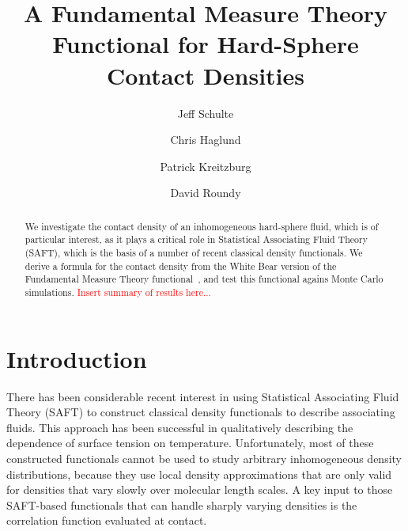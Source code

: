 \documentclass[letterpaper,twocolumn,amsmath,amssymb,jcp,10pt,aip]{revtex4-1}
\begin{document}
\title{A Fundamental Measure Theory Functional for Hard-Sphere Contact Densities}

\author{Jeff Schulte}
\author{Chris Haglund}
\author{Patrick Kreitzburg}
\author{David Roundy}


\begin{abstract}
  We investigate the contact density of an inhomogeneous hard-sphere
  fluid, which is of particular interest, as it plays a critical role
  in Statistical Associating Fluid Theory (SAFT), which is the basis
  of a number of recent classical density functionals.  We derive a
  formula for the contact density from the White Bear version of the
  Fundamental Measure Theory functional~\cite{roth2002whitebear}, and
  test this functional agains Monte Carlo simulations.
  \textcolor{red}{Insert summary of results here...}
\end{abstract}

\maketitle

\section{Introduction}

\newcommand\saftlocaldft{felipe2001examination, gloor2002saft,%
  gloor2004accurate, clark2006developing, gloor2007prediction,%
  kahl2008modified, gross2009density}
\newcommand\saftnonlocaldft{yu2002fmt-dft-inhomogeneous-associating,%
  fu2005vapor-liquid-dft,bryk2006density}

There has been considerable recent interest in using Statistical
Associating Fluid Theory (SAFT) to construct classical density
functionals to describe associating
fluids\cite{\saftlocaldft,\saftnonlocaldft}.  This approach has been
successful in qualitatively describing the dependence of surface
tension on temperature.  Unfortunately, most of these constructed
functionals\cite{\saftlocaldft} cannot be used to study arbitrary
inhomogeneous density distributions, because they use local density
approximations that are only valid for densities that vary slowly over
molecular length scales.  A key input to those SAFT-based functionals
that can handle sharply varying densities is the correlation function
evaluated at contact.
\end{document}
